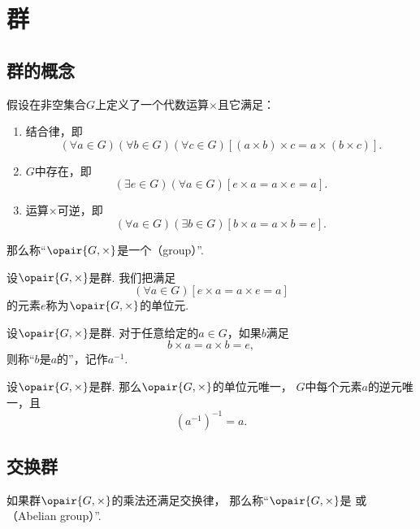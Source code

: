 \section{群}
\subsection{群的概念}
\begin{definition}
假设在非空集合\(G\)上定义了一个代数运算\(\times\)且它满足：
\begin{enumerate}
    \item 结合律，即\[
        (\forall a \in G)(\forall b \in G)(\forall c \in G)
        [(a \times b) \times c = a \times (b \times c)].
    \]

    \item \(G\)中存在，即\[
        (\exists e \in G)(\forall a \in G)
        [e \times a = a \times e = a].
    \]

    \item 运算\(\times\)可逆，即\[
        (\forall a \in G)(\exists b \in G)
        [b \times a = a \times b = e].
    \]
\end{enumerate}
那么称“\(\opair{G,\times}\)是一个（group）”.
\end{definition}

\begin{definition}
设\(\opair{G,\times}\)是群.
我们把满足\[
    (\forall a \in G)
    [e \times a = a \times e = a]
\]的元素\(e\)称为\(\opair{G,\times}\)的单位元.
\end{definition}

\begin{definition}
设\(\opair{G,\times}\)是群.
对于任意给定的\(a \in G\)，如果\(b\)满足\[
    b \times a = a \times b = e,
\]
则称“\(b\)是\(a\)的”，记作\(a^{-1}\).
\end{definition}

\begin{property}
设\(\opair{G,\times}\)是群.
那么\(\opair{G,\times}\)的单位元唯一，
\(G\)中每个元素\(a\)的逆元唯一，且\[
    (a^{-1})^{-1} = a.
\]
\end{property}

\subsection{交换群}
\begin{definition}
如果群\(\opair{G,\times}\)的乘法还满足交换律，
那么称“\(\opair{G,\times}\)是%
或（Abelian group）”.
\end{definition}
